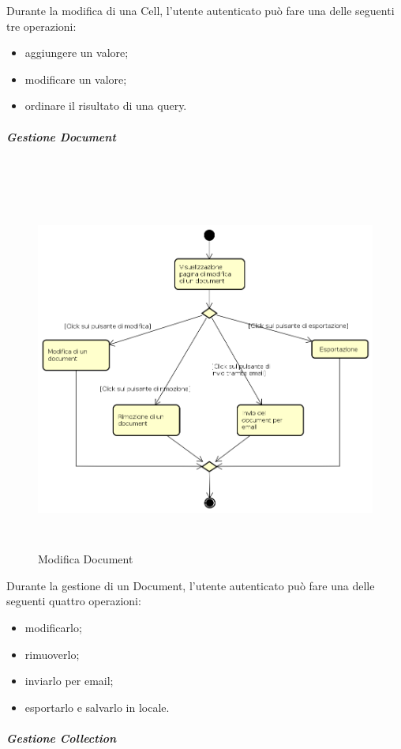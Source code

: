 Durante la modifica di una Cell, l'utente autenticato può fare una delle seguenti tre operazioni:
\begin{itemize}
\item aggiungere un valore;
\item modificare un valore;
\item ordinare il risultato di una query.
\end{itemize}
\subparagraph{Gestione Document} \mbox{} \\
\begin{figure}[H]
\begin{center}
\includegraphics[height=12cm]{res/sections/backend/activities/modificaDocument.png}
\caption{Modifica Document}
\end{center}
\end{figure}
Durante la gestione di un Document, l'utente autenticato può fare una delle seguenti quattro operazioni:
\begin{itemize}
\item modificarlo;
\item rimuoverlo;
\item inviarlo per email;
\item esportarlo e salvarlo in locale.
\end{itemize}
\subparagraph{Gestione Collection} \mbox{} \\
